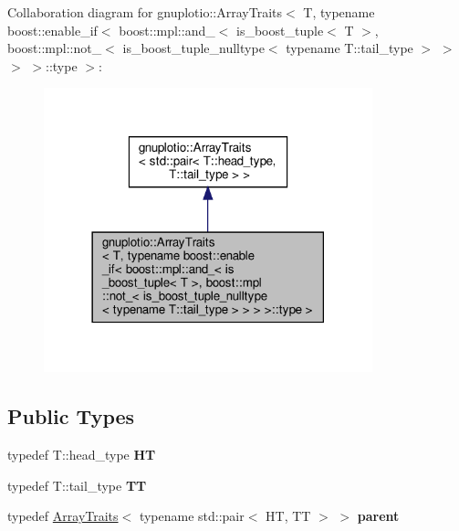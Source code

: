Collaboration diagram for gnuplotio\+:\+:Array\+Traits$<$ T, typename boost\+:\+:enable\+\_\+if$<$ boost\+:\+:mpl\+:\+:and\+\_\+$<$ is\+\_\+boost\+\_\+tuple$<$ T $>$, boost\+:\+:mpl\+:\+:not\+\_\+$<$ is\+\_\+boost\+\_\+tuple\+\_\+nulltype$<$ typename T\+:\+:tail\+\_\+type $>$ $>$ $>$ $>$\+:\+:type $>$\+:\nopagebreak
\begin{figure}[H]
\begin{center}
\leavevmode
\includegraphics[width=270pt]{classgnuplotio_1_1ArrayTraits_3_01T_00_01typename_01boost_1_1enable__if_3_01boost_1_1mpl_1_1and_5c5b3f7103a9f155bd15ec6df70697d0}
\end{center}
\end{figure}
\subsection*{Public Types}
\begin{DoxyCompactItemize}
\item 
\mbox{\label{classgnuplotio_1_1ArrayTraits_3_01T_00_01typename_01boost_1_1enable__if_3_01boost_1_1mpl_1_1and_371638f7d82cde4b7a8a064d0797371a_ab56761f05b74be318cc7becbc59348df}} 
typedef T\+::head\+\_\+type {\bfseries HT}
\item 
\mbox{\label{classgnuplotio_1_1ArrayTraits_3_01T_00_01typename_01boost_1_1enable__if_3_01boost_1_1mpl_1_1and_371638f7d82cde4b7a8a064d0797371a_a16316f598ab57b0b7ceea99dcd34632e}} 
typedef T\+::tail\+\_\+type {\bfseries TT}
\item 
\mbox{\label{classgnuplotio_1_1ArrayTraits_3_01T_00_01typename_01boost_1_1enable__if_3_01boost_1_1mpl_1_1and_371638f7d82cde4b7a8a064d0797371a_aad44f59a1d618b863442a9fdaa83d142}} 
typedef \hyperlink{classgnuplotio_1_1ArrayTraits}{Array\+Traits}$<$ typename std\+::pair$<$ HT, TT $>$ $>$ {\bfseries parent}
\end{DoxyCompactItemize}
